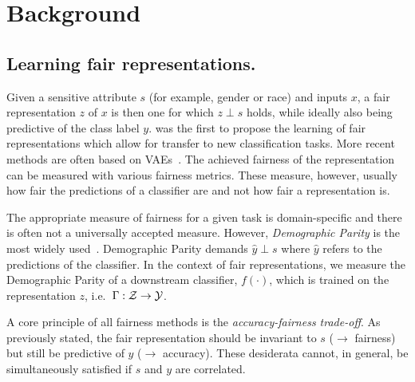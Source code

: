 \section{Background}\label{sec:background}

\subsection{Learning fair representations.}
Given a sensitive attribute $s$ (for example, gender or race) and inputs $x$, a fair
representation $z$ of $x$ is then one for which $z \perp s$ holds, while ideally
also being predictive of the class label $y$. 
%
\citet{zemel2013learning} was the first to propose the learning of fair representations which allow
for transfer to new classification tasks. More recent methods are often based on
\acfp{VAE}~\citep{kingma2013auto,louizos2016variational,edwards2016censoring,beutel2017data}. The
achieved fairness of the representation can be measured with various fairness metrics. These
measure, however, usually how fair the predictions of a classifier are and not how fair a
representation is.

The appropriate measure of fairness for a given task is domain-specific \citep{liu2018delayed} and
there is often not a universally accepted measure. However, \emph{Demographic Parity} is the most
widely used~\citep{louizos2016variational,edwards2016censoring,beutel2017data}. Demographic Parity
demands $\hat{y} \perp s$ where $\hat{y}$ refers to the predictions of the classifier. In the
context of fair representations, we measure the Demographic Parity of a downstream classifier,
$f(\cdot )$, which is trained on the representation $z$, i.e.\  $\Gamma: {\mathcal{Z}} \to {\mathcal{Y}}$.

A core principle of all fairness methods is the \emph{accuracy-fairness trade-off}. As previously
stated, the fair representation should be invariant to $s$ ($\to$ fairness) but still be predictive
of $y$ ($\to$ accuracy). These desiderata cannot, in general, be simultaneously satisfied if $s$
and $y$ are correlated.

